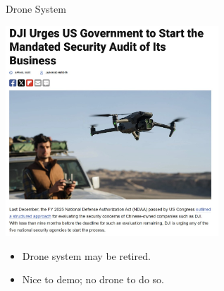 \begin{frame}{Drone System}
    \begin{center}
        \includegraphics[height=0.6\textheight,width=0.6\textwidth,keepaspectratio]{images/rtt/Screenshot 2025-04-14 223031.jpg}
    \end{center}
    \begin{itemize}
        \item Drone system may be retired.
        \item Nice to demo; no drone to do so.
    \end{itemize}
\end{frame}
